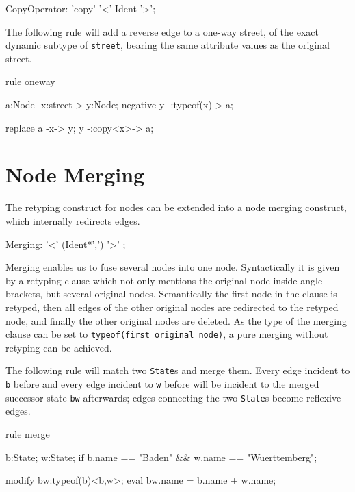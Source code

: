 \begin{rail}
  CopyOperator: 'copy' '<' Ident '>';
\end{rail}

\begin{example}
The following rule will add a reverse edge to a one-way street, of the exact dynamic subtype of \texttt{street}, bearing the same attribute values as the original street.
\begin{grgen}
rule oneway {
  a:Node -x:street-> y:Node;
  negative {
    y -:typeof(x)-> a;
  }

  replace {
    a -x-> y;
    y -:copy<x>-> a;
  }
}
\end{grgen}
\end{example}



\section{Node Merging} \label{sec:merge}
The retyping construct for nodes can be extended into a node merging construct,
which internally redirects edges.

\begin{rail}
  Merging: '<' (Ident*',') '>' ;
\end{rail}

Merging enables us to fuse several nodes into one node.
Syntactically it is given by a retyping clause which not only mentions the original node inside angle brackets, but several original nodes.
Semantically the first node in the clause is retyped, then all edges of the other original nodes are redirected to the retyped node, and finally the other original nodes are deleted.
As the type of the merging clause can be set to \texttt{typeof(first original node)}, a pure merging without retyping can be achieved.

\begin{example}
The following rule will match two \texttt{State}s and merge them.
Every edge incident to \texttt{b} before and every edge incident to \texttt{w} before will be incident to the merged successor state \texttt{bw} afterwards; edges connecting the two \texttt{State}s become reflexive edges.
\begin{grgen}
rule merge {
  b:State;
  w:State;
  if { b.name == "Baden" && w.name == "Wuerttemberg"; }

  modify {
    bw:typeof(b)<b,w>;
    eval { bw.name = b.name + w.name; }
  }
}
\end{grgen}
\end{example}


